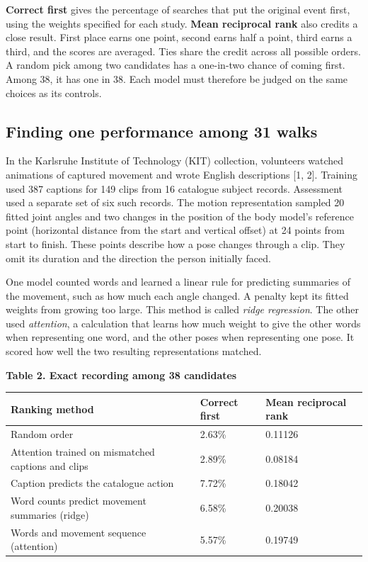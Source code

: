 \noindent \textbf{Correct first} gives the percentage of searches that put the original event first, using the weights specified for each study. \textbf{Mean reciprocal rank} also credits a close result. First place earns one point, second earns half a point, third earns a third, and the scores are averaged. Ties share the credit across all possible orders. A random pick among two candidates has a one-in-two chance of coming first. Among 38, it has one in 38. Each model must therefore be judged on the same choices as its controls.\par

\subsection*{Finding one performance among 31 walks}

\noindent In the Karlsruhe Institute of Technology (KIT) collection, volunteers watched animations of captured movement and wrote English descriptions [1, 2]. Training used 387 captions for 149 clips from 16 catalogue subject records. Assessment used a separate set of six such records. The motion representation sampled 20 fitted joint angles and two changes in the position of the body model's reference point (horizontal distance from the start and vertical offset) at 24 points from start to finish. These points describe how a pose changes through a clip. They omit its duration and the direction the person initially faced.\par

\noindent One model counted words and learned a linear rule for predicting summaries of the movement, such as how much each angle changed. A penalty kept its fitted weights from growing too large. This method is called \emph{ridge regression}. The other used \emph{attention}, a calculation that learns how much weight to give the other words when representing one word, and the other poses when representing one pose. It scored how well the two resulting representations matched.\par

\par\medskip\noindent\textbf{Table 2. Exact recording among 38 candidates}
\par\smallskip\noindent
\begin{tabular}{@{}p{.51\linewidth}p{.17\linewidth}p{.23\linewidth}@{}}
\textbf{Ranking method} & \textbf{Correct first} & \textbf{Mean reciprocal rank} \\
\hline
Random order & 2.63\% & 0.11126 \\
Attention trained on mismatched captions and clips & 2.89\% & 0.08184 \\
Caption predicts the catalogue action & 7.72\% & 0.18042 \\
Word counts predict movement summaries (ridge) & 6.58\% & 0.20038 \\
Words and movement sequence (attention) & 5.57\% & 0.19749 \\
\end{tabular}\par\medskip

